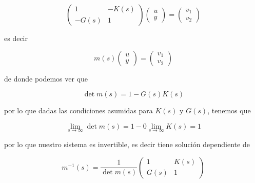         \begin{equation}
            \begin{pmatrix}
                1 & -K(s) \\
                -G(s) & 1
            \end{pmatrix}
            \begin{pmatrix}
                u \\
                y
            \end{pmatrix} =
            \begin{pmatrix}
                v_1 \\
                v_2
            \end{pmatrix}
        \end{equation}

        es decir

        \begin{equation*}
            m(s)
            \begin{pmatrix}
                u \\
                y
            \end{pmatrix} =
            \begin{pmatrix}
                v_1 \\
                v_2
            \end{pmatrix}
        \end{equation*}

        de donde podemos ver que

        \begin{equation*}
            \det{m(s)} = 1 - G(s) K(s)
        \end{equation*}

        por lo que dadas las condiciones asumidas para $K(s)$ y $G(s)$, tenemos que

        \begin{equation*}
            \lim_{s \to \infty} \det{m(s)} = 1 - 0 \lim_{s \to \infty} K(s) = 1
        \end{equation*}

        por lo que nuestro sistema es invertible, es decir tiene solución dependiente de

        \begin{equation*}
            m^{-1}(s) = \frac{1}{\det{m(s)}}
            \begin{pmatrix}
                1 & K(s) \\
                G(s) & 1
            \end{pmatrix}
        \end{equation*}

